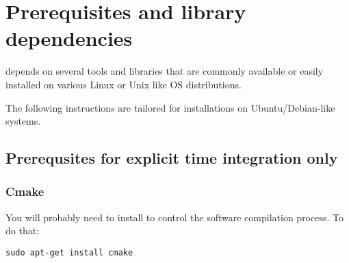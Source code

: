 \documentclass[11pt,fleqn]{book} %
\begin{document}
\chapter{Prerequisites and library dependencies}
\Vaango depends on several tools and libraries that are
commonly available or easily installed on various Linux or Unix like
OS distributions.  

\begin{WarningBox}
The following instructions are tailored for installations on Ubuntu/Debian-like systems.
\end{WarningBox}

\section{Prerequsites for explicit time integration only}
\subsection{Cmake}
You will probably need to install  to control the software compilation process. To do that:
\begin{lstlisting}[backgroundcolor=\color{background}]
     sudo apt-get install cmake
\end{lstlisting}
\end{document}
